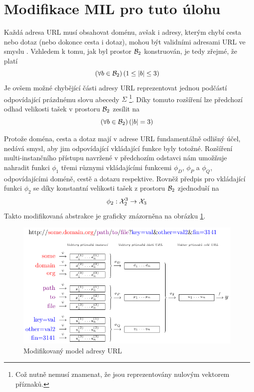 \section{Modifikace MIL pro tuto úlohu}\label{MIL-modification}
Každá adresa URL musí obsahovat doménu, avšak i adresy, kterým chybí cesta nebo dotaz (nebo dokonce cesta i dotaz), mohou být validními adresami URL ve smyslu \cite{berners-lee_uniform_1994}. Vzhledem k tomu, jak byl prostor \( \mathcal B_2 \) konstruován, je tedy zřejmé, že platí
\[ \left( \forall b \in \mathcal B_2 \right) \left( 1 \leq \left| b \right| \leq 3 \right) \]
Je ovšem možné chybějící části adresy URL reprezentovat jednou podčástí odpovídající prázdnému slovu abecedy \( \Sigma \) \footnote{Což nutně nemusí znamenat, že jsou reprezentovány nulovým vektorem příznaků.}. Díky tomuto rozšíření lze předchozí odhad velikosti tašek v prostoru \( \mathcal B_2 \) zesílit na
\[ \left( \forall b \in \mathcal B_2 \right) \left( \left| b \right| = 3 \right) \]

Protože doména, cesta a dotaz mají v adrese URL fundamentálně odlišný účel, nedává smysl, aby jim odpovídající vkládající funkce byly totožné. Rozšíření multi-instančního přístupu navržené v předchozím odstavci nám umožňuje nahradit funkci \( \phi_1 \) třemi různymi vkládajícími funkcemi \( \phi_D \), \( \phi_P \) a \( \phi_Q \), odpovídajícími doméně, cestě a dotazu respektive. Rovněž předpis pro vkládající funkci \( \phi_2 \) se díky konstantní velikosti tašek z prostoru \( \mathcal B_2 \) zjednoduší na
\[ \phi_2 : \mathcal X_2^3 \to \mathcal X_3 \]
Takto modifikovaná abstrakce je graficky znázorněna na obrázku \ref{url_model_modified_MIL}.

\begin{figure}[h]
	\centering
	\includegraphics{images/model_modified_MIL/model_modified_MIL.pdf}
	\caption{Modifikovaný model adresy URL}\label{url_model_modified_MIL}
\end{figure}

